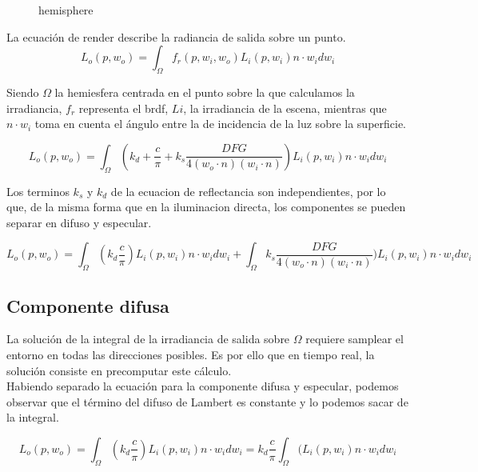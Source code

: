 \begin{figure}[H]
    \vspace{0.5cm}
    \centering
    \caption{hemisphere}
  \end{figure}
  \singlespacing

La ecuaci\'on de render describe la radiancia de salida sobre un punto.
\begin{equation}
L_o(p, w_o) = \int_{\Omega} f_r(p, w_i, w_o)L_i(p, w_i)n\cdot{w_i}dw_i
\end{equation}
\singlespacing

Siendo $\Omega$ la hemiesfera centrada en el punto sobre la que calculamos la irradiancia,
$f_r$ representa el brdf, $Li$, la irradiancia de la escena, mientras que $n\cdot{w_i}$ toma en
cuenta el \'angulo entre la de incidencia de la luz sobre la superficie.

\begin{equation}
L_o(p, w_o) = \int_{\Omega} (k_d + \frac{c}{\pi} + 
k_s \frac{DFG}{4(w_o\cdot{n})(w_i\cdot{n})})L_i(p, w_i)n\cdot{w_i}dw_i
\end{equation}
\singlespacing

Los terminos $k_s$ y $k_d$ de la ecuacion de reflectancia son independientes, por lo que, de la
misma forma que en la iluminacion directa, los componentes se pueden separar en difuso y
especular.

\begin{equation}
L_o(p, w_o) = \int_{\Omega}
(k_d \frac{c}{\pi}) L_i(p, w_i)n\cdot{w_i}dw_i +
\int_{\Omega} 
k_s \frac{DFG}{4(w_o\cdot{n})(w_i\cdot{n})})L_i(p, w_i)n\cdot{w_i}dw_i
\end{equation}
\singlespacing

    \subsection{Componente difusa}
    La soluci\'on de la integral de la irradiancia de salida sobre $\Omega$ requiere samplear el entorno
    en todas las direcciones posibles. Es por ello que en tiempo real, la soluci\'on consiste en
    precomputar este c\'alculo.\\

    Habiendo separado la ecuaci\'on para la componente difusa y especular, podemos observar que el t\'ermino del difuso
    de Lambert es constante y lo podemos sacar de la integral.

    \begin{equation}
    L_o(p, w_o) = \int_{\Omega}
    (k_d \frac{c}{\pi}) L_i(p, w_i)n\cdot{w_i}dw_i=
    k_d \frac{c}{\pi} \int_{\Omega}
    (L_i(p, w_i)n\cdot{w_i}dw_i
    \end{equation}
    \singlespacing

